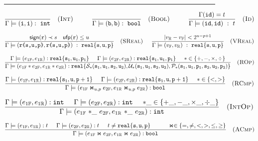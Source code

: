 \begin{figure}[tb]
\hrule
\vspace{0.1cm}
$$
\frac{}
     {\Gamma \models (\texttt{i},\texttt{i}) :\ \mathtt{int} }\quad\textsc{(Int)}
	 \hspace{1cm}
\frac{}
     {\Gamma \models (\texttt{b},\texttt{b}) :\ \mathtt{bool} }\quad\textsc{(Bool)}
\hspace{1cm}
\frac{\Gamma(\mathtt{id})=t}
     {\Gamma \models (\mathtt{id},\mathtt{id})\ :\ t }\quad\textsc{(Id)}
$$

$$
\frac{\mathsf{sign}(\texttt{r}) \prec s\quad \mathsf{ufp}(\texttt{r})\le u}
     {\Gamma \models (\texttt{r\{s,u,p\}},\texttt{r\{s,u,p\}})\ :\ \F{s}{u}{p} }\quad\textsc{(SReal)}
\hspace{0.5cm}
\frac{|v_\bbr-v_\bbf|<2^{u-p+1}}
     {\Gamma \models (v_\bbf,v_\bbr)\ :\ \F{s}{u}{p} }\quad\textsc{(VReal)}
$$

$$
\frac{\Gamma \models (e_{1\mathbb{F}},e_{1\mathbb{R}}) : \mathtt{real\{s_1,u_1,p_1\}}\hspace{0.5cm} 
      \Gamma \models (e_{2\mathbb{F}},e_{2\mathbb{R}}) : \mathtt{real\{s_1,u_1,p_1\}}
\hspace{0.5cm}\ast\in\{+,-,\times,\div\}
}
     {\Gamma \models (e_{1\mathbb{F}}\ast e_{2\mathbb{F}},e_{1\mathbb{R}}\ast e_{2\mathbb{R}}) :  
\mathtt{real\{\mathcal{S}_\ast(s_1,u_1,s_2,u_2),\mathcal{U}_\ast(s_1,u_1,s_2,u_2),\mathcal{P}_\ast(s_1,u_1,p_1,s_2,u_2,p_2)\}}
}\quad\textsc{(ROp)}
$$

$$
\frac{\Gamma \models (e_{1\mathbb{F}},e_{1\mathbb{R}}) : \mathtt{real\{s_1,u,p+1\}}\hspace{0.5cm} 
      \Gamma \models (e_{2\mathbb{F}},e_{2\mathbb{R}}) : \mathtt{real\{s_1,u,p+1\}}
\hspace{0.5cm}\ast\in\{<,>\}
}
     {\Gamma \models (e_{1\mathbb{F}}\Join_{u,p} e_{2\mathbb{F}},e_{1\mathbb{R}}\Join_{u,p} e_{2\mathbb{R}}) :  
\mathtt{bool}
}\quad\textsc{(RCmp)}
$$

$$
\frac{\Gamma \models (e_{1\bbf},e_{1\bbr}) : \mathtt{int}\hspace{0.5cm} 
      \Gamma \models (e_{2\bbf},e_{2\bbr}) : \mathtt{int}
\hspace{0.5cm}{\ast\_}\in\{+\_,-\_,\times\_,\div\_\}
}
     {\Gamma \models (e_{1\bbf}\ {\ast\_}\ e_{2\bbf},e_{1\bbr}\ {\ast\_}\ e_{2\bbr}) :  
\mathtt{int}
}\quad\textsc{(IntOp)}
$$

$$
\frac{\Gamma \models (e_{1\mathbb{F}},e_{1\mathbb{R}}) : t\hspace{0.5cm} 
      \Gamma \models (e_{2\mathbb{F}},e_{2\mathbb{R}}) : t\hspace{0.5cm}t\not=\mathtt{real\{s,u,p\}}
\hspace{1cm}\Join\in\{=,\not=,<,>,\le,\ge\}
}
     {\Gamma \models (e_{1\mathbb{F}}\Join e_{2\mathbb{F}},e_{1\mathbb{R}}\Join e_{2\mathbb{R}}) :  
\mathtt{bool}
}\quad\textsc{(ACmp)}
$$



\end{figure}
